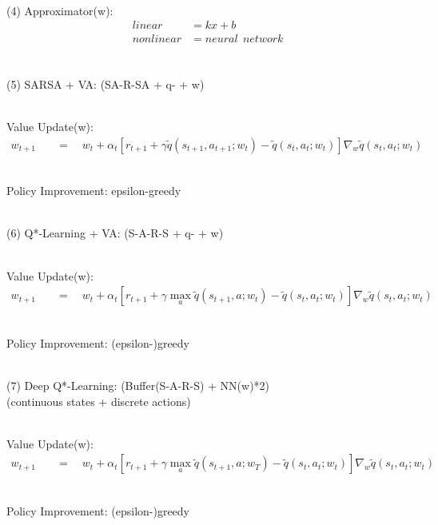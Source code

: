 \documentclass{article}
\begin{document}
~ \\[3pt]
(4) Approximator(w): 
\begin{align*}
    linear    &= kx + b \\[3pt]
    nonlinear &= neural \ \ network \\[3pt]
\end{align*}


\newpage


~ \\[3pt]
(5) SARSA + VA: \qquad (SA-R-SA + q- + w) 

~ \\[3pt]
Value Update(w): 
\begin{align*}
    w_{t+1} & 
            \quad = \quad w_{t} + \alpha_{t} 
            [ r_{t+1} + \gamma \tilde{q}(s_{t+1}, a_{t+1}; w_{t}) 
            - \tilde{q}(s_{t}, a_{t}; w_{t}) ] 
            \nabla_{w} \tilde{q}(s_{t}, a_{t}; w_{t}) 
\end{align*}

~ \\[3pt]
Policy Improvement: epsilon-greedy


~ \\[48pt]
(6) Q*-Learning + VA: \qquad (S-A-R-S + q- + w) 

~ \\[3pt]
Value Update(w): 
\begin{align*}
    w_{t+1} & 
            \quad = \quad w_{t} + \alpha_{t} 
            [ r_{t+1} + \gamma \max_{a} \tilde{q}(s_{t+1}, a; w_{t}) 
            - \tilde{q}(s_{t}, a_{t}; w_{t}) ] 
            \nabla_{w} \tilde{q}(s_{t}, a_{t}; w_{t}) 
\end{align*}

~ \\[3pt]
Policy Improvement: (epsilon-)greedy 


~ \\[48pt]
(7) Deep Q*-Learning: \qquad (Buffer(S-A-R-S) + NN(w)*2) \\[3pt]
\qquad (continuous states + discrete actions)

~ \\[3pt]
Value Update(w): 
\begin{align*}
    w_{t+1} & 
            \quad = \quad w_{t} + \alpha_{t} 
            [ r_{t+1} + \gamma \max_{a} \tilde{q}(s_{t+1}, a; w_{T}) 
            - \tilde{q}(s_{t}, a_{t}; w_{t}) ] 
            \nabla_{w} \tilde{q}(s_{t}, a_{t}; w_{t}) 
\end{align*}

~ \\[3pt]
Policy Improvement: (epsilon-)greedy 
\end{document}
